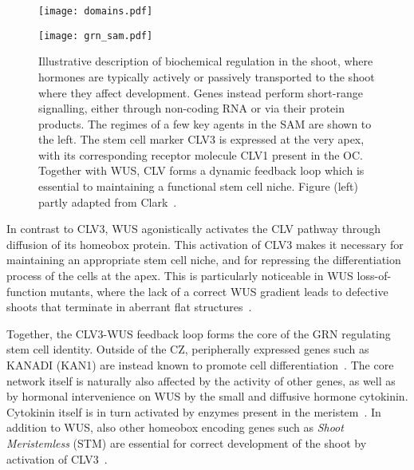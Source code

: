 \begin{figure}[H]
  \centering
  \begin{minipage}{0.55\textwidth}
    \centering
    \texttt{[image: domains.pdf]}
  \end{minipage}\hfill
  \begin{minipage}{0.45\textwidth}
    \centering
    \texttt{[image: grn\_sam.pdf]} 
  \end{minipage}
  \caption[Regulation of apical stem cells]{Illustrative description of
    biochemical regulation in the shoot, where hormones are typically actively or
    passively transported to the shoot where they affect development. Genes
    instead perform short-range signalling, either through non-coding RNA or
    via their protein products. The regimes of a few
    key agents in the SAM are shown to the left. The stem cell marker CLV3 is expressed at the
    very apex, with its corresponding receptor molecule CLV1 present in the
    OC. Together with WUS, CLV forms a dynamic feedback loop which is
    essential to maintaining a functional stem cell niche. Figure (left) partly
    adapted from Clark~\cite{clark2001cell}.}
  \label{fig:sam_grn}
\end{figure}

In contrast to CLV3, WUS agonistically  
activates the CLV pathway through diffusion of its homeobox protein. This
activation of CLV3 makes it necessary for maintaining an appropriate stem
cell niche, and for repressing the differentiation process of the cells at the
apex. This is particularly noticeable in WUS loss-of-function mutants, where the
lack of a correct WUS gradient leads to defective shoots that terminate in
aberrant flat structures~\cite{laux1996wuschel}.

Together, the CLV3-WUS feedback loop forms the core of the GRN regulating stem
cell identity. Outside of the CZ, peripherally expressed genes such as KANADI
(KAN1) are instead known to promote cell
differentiation~\cite{kerstetter2001kanadi}. The core network
itself is naturally  also affected by the activity of other genes, as well as by hormonal
intervenience on WUS by the small and diffusive hormone cytokinin. Cytokinin
itself is in turn activated by enzymes present in the meristem~\cite{hutchison2002cytokinin}.
In addition to WUS, also other homeobox encoding genes such as \textit{Shoot Meristemless} (STM) are
essential for correct development of the shoot by activation of
CLV3~\cite{scofield2013arabidopsis}.

